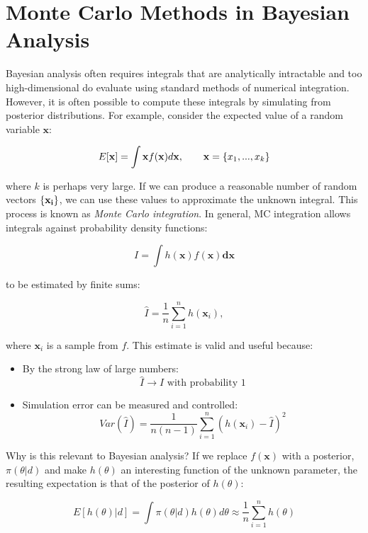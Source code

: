 
\hypertarget{monte-carlo-methods-in-bayesian-analysis}{}

\section*{Monte Carlo Methods in Bayesian Analysis}

Bayesian analysis often requires integrals that are analytically intractable and too high-dimensional do evaluate using standard methods of numerical integration. However, it is often possible to compute these integrals by simulating from posterior distributions. For example, consider the expected value of a random variable $\mathbf{x}$:

\[
E[{\bf x}] = \int {\bf x} f({\bf x}) d{\bf x}, \qquad
{\bf x} = \{x_1,...,x_k\}
\]

\noindent where $k$ is perhaps very large. If we can produce a reasonable number of random vectors $\{{\bf x_i}\}$, we can use these values to approximate the unknown integral. This process is known as {\em Monte Carlo integration}. In general, MC integration allows integrals against probability density functions:

\[
I = \int h(\mathbf{x}) f(\mathbf{x}) \mathbf{dx}
\]

\noindent to be estimated by finite sums:

\[
\hat{I} = \frac{1}{n}\sum_{i=1}^n h(\mathbf{x}_i),
\]

\noindent where $\mathbf{x}_i$ is a sample from $f$. This estimate is valid and useful because:

\begin{itemize}
\item
By the strong law of large numbers:
\[\hat{I} \rightarrow I   \mbox{   with probability 1}\]
\item
Simulation error can be measured and controlled:
\[Var(\hat{I}) = \frac{1}{n(n-1)}\sum_{i=1}^n (h(\mathbf{x}_i)-\hat{I})^2\]
\end{itemize}

Why is this relevant to Bayesian analysis? If we replace $f(\mathbf{x})$ with a posterior, $\pi(\theta|d)$ and make $h(\theta)$ an interesting function of the unknown parameter, the resulting expectation is that of the posterior of $h(\theta)$:

\[
E[h(\theta)|d] = \int \pi(\theta|d) h(\theta) d\theta \approx \frac{1}{n}\sum_{i=1}^n h(\theta)
\]

